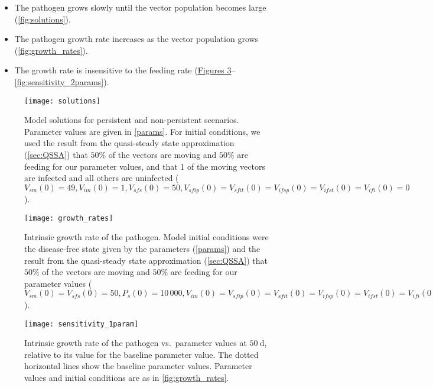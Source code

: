 \documentclass{article}
\begin{document}
\begin{itemize}
\item The pathogen grows slowly until the vector population becomes
  large (\autoref{fig:solutions}).

\item The pathogen growth rate increases as the vector population
  grows (\autoref{fig:growth_rates}).

\item The growth rate is insensitive to the feeding rate
  (\hyperref[fig:sensitivity_1param]{Figures
    \ref*{fig:sensitivity_1param}}--\ref{fig:sensitivity_2params}).
\end{itemize}


\begin{figure}
  \centering
  \texttt{[image: solutions]}
  \caption{Model solutions for persistent and non-persistent
    scenarios.  Parameter values are given in \autoref{params}.
    For initial conditions, we used the result from the quasi-steady
    state approximation (\autoref{sec:QSSA}) that $50\%$ of the
    vectors are moving and $50\%$ are feeding for our parameter
    values, and that 1 of the moving vectors are infected and all
    others are uninfected ($V_{sm}(0) = 49, V_{im}(0) = 1, V_{sfs}(0) =
    50, V_{sfip}(0) = V_{sfit}(0) = V_{ifsp}(0) = V_{ifst}(0) =
    V_{ifi}(0) = 0$).}
  \label{fig:solutions}
\end{figure}

\begin{figure}
  \centering
  \texttt{[image: growth\_rates]}
  \caption{Intrinsic growth rate of the pathogen.  Model initial
    conditions were the disease-free state given by the parameters
    (\autoref{params}) and the result from the quasi-steady state
    approximation (\autoref{sec:QSSA}) that $50\%$ of the vectors are
    moving and $50\%$ are feeding for our parameter values ($V_{sm}(0)
    = V_{sfs}(0) = 50, P_s(0) = 10\,000, V_{im}(0) = V_{sfip}(0) =
    V_{sfit}(0) = V_{ifsp}(0) = V_{ifst}(0) = V_{ifi}(0) = P_i(0) =
    0$).}
  \label{fig:growth_rates}
\end{figure}

\begin{figure}
  \centering
  \texttt{[image: sensitivity\_1param]}
  \caption{Intrinsic growth rate of the pathogen vs.~parameter values
    at $50~\text{d}$, relative to its value for the baseline
    parameter value.  The dotted horizontal lines show the baseline
    parameter values.  Parameter values and initial conditions are as
    in \autoref{fig:growth_rates}.}
  \label{fig:sensitivity_1param}
\end{figure}
\end{document}
